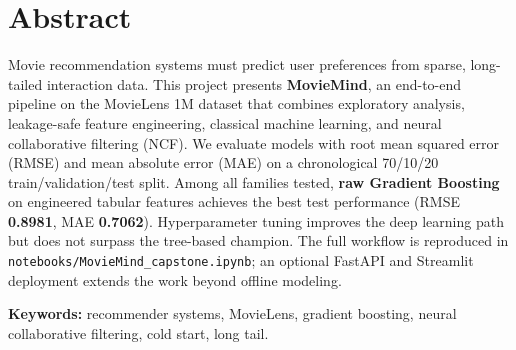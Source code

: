 \section{Abstract}

Movie recommendation systems must predict user preferences from sparse, long-tailed interaction data.
This project presents \textbf{MovieMind}, an end-to-end pipeline on the MovieLens 1M dataset that combines
exploratory analysis, leakage-safe feature engineering, classical machine learning, and neural collaborative
filtering (NCF).
We evaluate models with root mean squared error (RMSE) and mean absolute error (MAE) on a chronological
70/10/20 train/validation/test split.
Among all families tested, \textbf{raw Gradient Boosting} on engineered tabular features achieves the best
test performance (RMSE \textbf{0.8981}, MAE \textbf{0.7062}).
Hyperparameter tuning improves the deep learning path but does not surpass the tree-based champion.
The full workflow is reproduced in \texttt{notebooks/MovieMind\_capstone.ipynb}; an optional FastAPI and
Streamlit deployment extends the work beyond offline modeling.

\textbf{Keywords:} recommender systems, MovieLens, gradient boosting, neural collaborative filtering, cold start, long tail.
